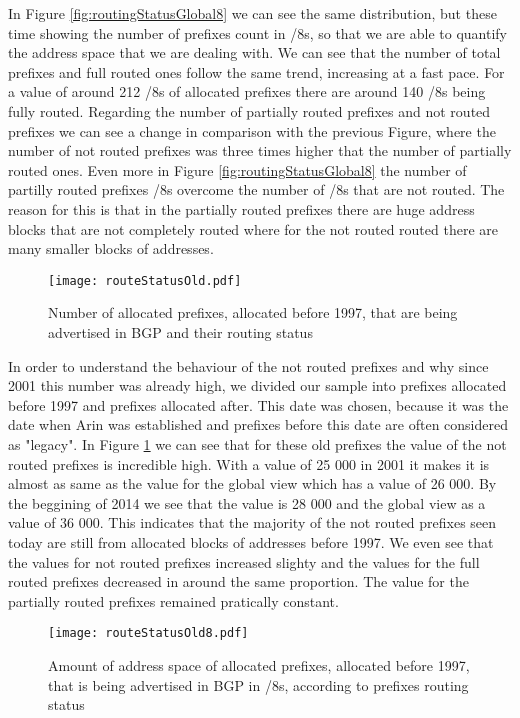 \documentclass[11pt,a4paper]{scrreprt}
\begin{document}
In Figure \ref{fig:routingStatusGlobal8} we can see the same distribution, but these time showing the number of prefixes count in /8s, so that we are able to quantify the address space that we are dealing with. We can see that the number of total prefixes and full routed ones follow the same trend, increasing at a fast pace. For a value of around 212 /8s of allocated prefixes there are around 140 /8s being fully routed. Regarding the number of partially routed prefixes and not routed prefixes we can see a change in comparison with the previous Figure, where the number of not routed prefixes was three times higher that the number of partially routed ones. Even more in Figure \ref{fig:routingStatusGlobal8} the number of partilly routed prefixes /8s overcome the number of /8s that are not routed. The reason for this is that in the partially routed prefixes there are huge address blocks that are not completely routed where for the not routed routed there are many smaller blocks of addresses.  

\begin{figure}[!h]
\centering
\texttt{[image: routeStatusOld.pdf]}
\caption{Number of allocated prefixes, allocated before 1997, that are being advertised in BGP and their routing status}
\label{fig:routingStatusOld}
\end{figure}

In order to understand the behaviour of the not routed prefixes and why since 2001 this number was already high, we divided our sample into prefixes allocated before 1997 and prefixes allocated after. This date was chosen, because it was the date when Arin was established and prefixes before this date are often considered as "legacy".
In Figure \ref{fig:routingStatusOld} we can see that for these old prefixes the value of the not routed prefixes is incredible high. With a value of 25 000 in 2001 it makes it is almost as same as the value for the global view which has a value of 26 000. By the beggining of 2014 we see that the value is 28 000 and the global view as a value of 36 000. This indicates that the majority of the not routed prefixes seen today are still from allocated blocks of addresses before 1997. We even see that the values for not routed prefixes increased slighty and the values for the full routed prefixes decreased in around the same proportion. The value for the partially routed prefixes remained pratically constant.

\begin{figure}[!h]
\centering
\texttt{[image: routeStatusOld8.pdf]}
\caption{Amount of address space of allocated prefixes, allocated before 1997, that is being advertised in BGP in /8s, according to prefixes routing status}
\label{fig:routingStatusOld8}
\end{figure}
\end{document}
